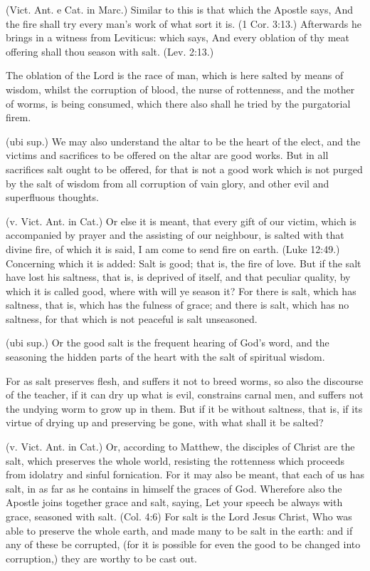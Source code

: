  (Vict. Ant. e Cat. in Marc.) Similar to this is that which the Apostle says, And the fire shall try every man’s work of what sort it is. (1 Cor. 3:13.) Afterwards he brings in a witness from Leviticus: which says, And every oblation of thy meat offering shall thou season with salt. (Lev. 2:13.)

 The oblation of the Lord is the race of man, which is here salted by means of wisdom, whilst the corruption of blood, the nurse of rottenness, and the mother of worms, is being consumed, which there also shall he tried by the purgatorial firem.

 (ubi sup.) We may also understand the altar to be the heart of the elect, and the victims and sacrifices to be offered on the altar are good works. But in all sacrifices salt ought to be offered, for that is not a good work which is not purged by the salt of wisdom from all corruption of vain glory, and other evil and superfluous thoughts.

 (v. Vict. Ant. in Cat.) Or else it is meant, that every gift of our victim, which is accompanied by prayer and the assisting of our neighbour, is salted with that divine fire, of which it is said, I am come to send fire on earth. (Luke 12:49.) Concerning which it is added: Salt is good; that is, the fire of love. But if the salt have lost his saltness, that is, is deprived of itself, and that peculiar quality, by which it is called good, where with will ye season it? For there is salt, which has saltness, that is, which has the fulness of grace; and there is salt, which has no saltness, for that which is not peaceful is salt unseasoned.

 (ubi sup.) Or the good salt is the frequent hearing of God’s word, and the seasoning the hidden parts of the heart with the salt of spiritual wisdom.

 For as salt preserves flesh, and suffers it not to breed worms, so also the discourse of the teacher, if it can dry up what is evil, constrains carnal men, and suffers not the undying worm to grow up in them. But if it be without saltness, that is, if its virtue of drying up and preserving be gone, with what shall it be salted?

 (v. Vict. Ant. in Cat.) Or, according to Matthew, the disciples of Christ are the salt, which preserves the whole world, resisting the rottenness which proceeds from idolatry and sinful fornication. For it may also be meant, that each of us has salt, in as far as he contains in himself the graces of God. Wherefore also the Apostle joins together grace and salt, saying, Let your speech be always with grace, seasoned with salt. (Col. 4:6) For salt is the Lord Jesus Christ, Who was able to preserve the whole earth, and made many to be salt in the earth: and if any of these be corrupted, (for it is possible for even the good to be changed into corruption,) they are worthy to be cast out.

